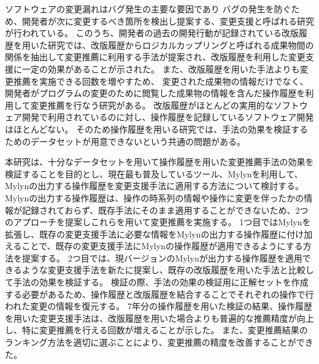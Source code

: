 ソフトウェアの変更漏れはバグ発生の主要な要因であり
バグの発生を防ぐため、開発者が次に変更するべき箇所を検出し提案する、変更支援と呼ばれる研究が行われている。
このうち、開発者の過去の開発行動が記録されている改版履歴を用いた研究では、改版履歴からロジカルカップリングと呼ばれる成果物間の関係を抽出して変更推薦に利用する手法が提案され、改版履歴を利用した変更支援に一定の効果があることが示された。
また、改版履歴を用いた手法よりも変更推薦を実施できる回数を増やすため、
変更された成果物の情報だけでなく、開発者がプログラムの変更のために閲覧した成果物の情報を含んだ操作履歴を利用して変更推薦を行なう研究がある。
改版履歴がほとんどの実用的なソフトウェア開発で利用されているのに対し、操作履歴を記録しているソフトウェア開発はほとんどない。
そのため操作履歴を用いる研究では、手法の効果を検証するためのデータセットが用意できないという共通の問題がある。

本研究は、十分なデータセットを用いて操作履歴を用いた変更推薦手法の効果を検証することを目的とし、現在最も普及しているツール、Mylynを利用して、Mylynの出力する操作履歴を変更支援手法に適用する方法について検討する。
Mylynの出力する操作履歴は、操作の時系列の情報や操作に変更を伴ったかの情報が記録されておらず、既存手法にそのまま適用することができないため、2つのアプローチを提案しこれらを用いて変更推薦を実施する。
1つ目ではMylynを拡張し、既存の変更支援手法に必要な情報をMylynの出力する操作履歴に付け加えることで、既存の変更支援手法にMylynの操作履歴が適用できるようにする方法を提案する。
2つ目では、現バージョンのMylynが出力する操作履歴を適用できるような変更支援手法を新たに提案し、既存の改版履歴を用いた手法と比較して手法の効果を検証する。
検証の際、手法の効果の検証用に正解セットを作成する必要があるため、操作履歴と改版履歴を結合することでそれぞれの操作で行われた変更の情報を復元する。
7年分の操作履歴を用いた検証の結果、操作履歴を用いた変更支援手法は、改版履歴を用いた場合よりも普遍的な推薦精度が向上し、特に変更推薦を行える回数が増えることが示した。
また、変更推薦結果のランキング方法を適切に選ぶことにより、変更推薦の精度を改善することができた。

